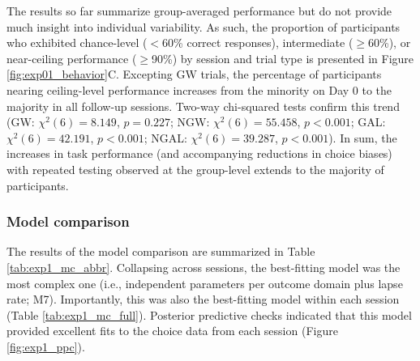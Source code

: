 \documentclass[a4paper,12pt]{article}
\begin{document}
\begin{refsection}[main]
The results so far summarize group-averaged performance but do not provide much insight into individual variability. As such, the proportion of participants who exhibited chance-level ($<$60\% correct responses), intermediate ($\geq$60\%), or near-ceiling performance ($\geq$90\%) by session and trial type is presented in Figure \ref{fig:exp01_behavior}C. Excepting GW trials, the percentage of participants nearing ceiling-level performance increases from the minority on Day 0 to the majority in all follow-up sessions. Two-way chi-squared tests confirm this trend (GW: $\chi^2 (6) = 8.149$, $p = 0.227$; NGW: $\chi^2 (6) = 55.458$, $p < 0.001$; GAL: $\chi^2 (6) = 42.191$, $p < 0.001$; NGAL: $\chi^2 (6) = 39.287$, $p < 0.001$). In sum, the increases in task performance (and accompanying reductions in choice biases) with repeated testing observed at the group-level extends to the majority of participants. 

\subsubsection*{Model comparison}

The results of the model comparison are summarized in Table \ref{tab:exp1_mc_abbr}. Collapsing across sessions, the best-fitting model was the most complex one (i.e., independent parameters per outcome domain plus lapse rate; M7). Importantly, this was also the best-fitting model within each session (Table \ref{tab:exp1_mc_full}). Posterior predictive checks indicated that this model provided excellent fits to the choice data from each session (Figure \ref{fig:exp1_ppc}). 


\end{refsection}
\end{document}
